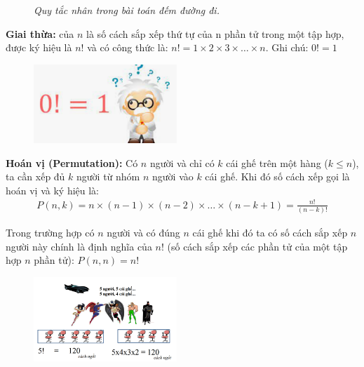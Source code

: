 \begin{multicols}{2}
\begin{figure}[H]
		\caption{\small\textit{Quy tắc nhân trong bài toán đếm đường đi.}}
		\vspace*{-10pt}
	\end{figure}
\textbf{\color{toancuabi}Giai thừa:} của $n$ là số cách sắp xếp thứ tự của n phần tử trong một tập hợp, được ký hiệu là $n!$ và có công thức là: $n!=1\times 2\times 3\times \ldots\times n $.
\vskip 0.1cm
Ghi chú: $0!=1$
	\begin{figure}[H]
	\centering
	\vspace*{-5pt}
	\captionsetup{labelformat=empty, justification=centering}
	\includegraphics[width=0.48\textwidth]{3}
	\vspace*{-15pt}
\end{figure}
\end{multicols}
\textbf{\color{toancuabi}Hoán vị (Permutation):} Có $n$ người và chỉ có $k$ cái ghế trên một hàng ($k\le n$), ta cần xếp đủ $k$ người từ nhóm $n$ người vào $k$ cái ghế. Khi đó số cách xếp gọi là hoán vị và ký hiệu là:
\begin{align*}
	P(n,k)=n\times(n-1)\times(n-2)\times\ldots\times(n-k+1)= \frac{n!}{(n-k)!} 
\end{align*}
\begin{multicols}{2}
	Trong trường hợp có $n$ người và có đúng $n$ cái ghế khi đó ta có số cách sắp xếp $n$ người này chính là định nghĩa của $n!$ (số cách sắp xếp các phần tử của một tập hợp $n$ phần tử): $P(n,n)=n!$
	\begin{figure}[H]
		\centering
		\captionsetup{labelformat=empty, justification=centering}
		\includegraphics[width=0.48\textwidth]{4}
		\vspace*{-10pt}
	\end{figure}
\end{multicols}
